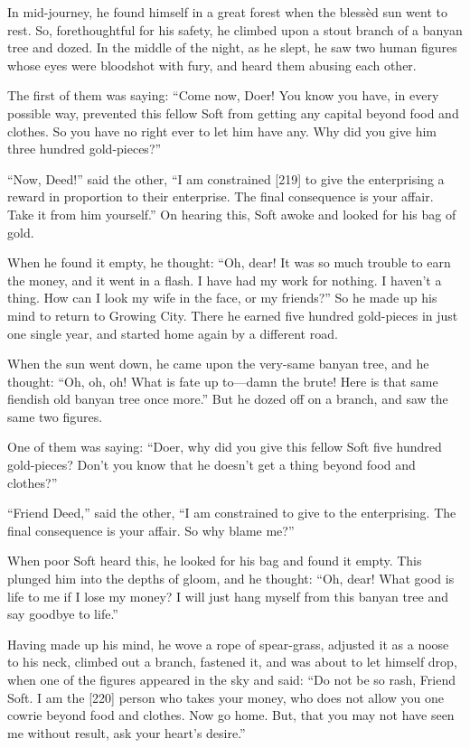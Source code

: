 \documentclass[article, twoside, 14pt]{memoir}
\begin{document}
In mid-journey, he found himself in a great forest when the blessèd
sun went to rest. So, forethoughtful for his safety, he climbed
upon a stout branch of a banyan tree and dozed. In the middle of
the night, as he slept, he saw two human figures whose eyes were
bloodshot with fury, and heard them abusing each other.

The first of them was saying:
``Come now, Doer! You know you have, in every possible way, prevented this fellow Soft from getting any capital beyond food and clothes. So you have no right ever to let him have any. Why did you give him three hundred gold-pieces?''

``Now, Deed!'' said the other,
``I am constrained [219] to give the enterprising a reward in proportion to their enterprise. The final consequence is your affair. Take it from him yourself.''
On hearing this, Soft awoke and looked for his bag of gold.

When he found it empty, he thought:
``Oh, dear! It was so much trouble to earn the money, and it went in a flash. I have had my work for nothing. I haven't a thing. How can I look my wife in the face, or my friends?''
So he made up his mind to return to Growing City. There he earned
five hundred gold-pieces in just one single year, and started home
again by a different road.

When the sun went down, he came upon the very-same banyan tree, and
he thought:
``Oh, oh, oh! What is fate up to---damn the brute! Here is that same fiendish old banyan tree once more.''
But he dozed off on a branch, and saw the same two figures.

One of them was saying:
``Doer, why did you give this fellow Soft five hundred gold-pieces? Don't you know that he doesn't get a thing beyond food and clothes?''

``Friend Deed,'' said the other,
``I am constrained to give to the enterprising. The final consequence is your affair. So why blame me?''

When poor Soft heard this, he looked for his bag and found it
empty. This plunged him into the depths of gloom, and he thought:
``Oh, dear! What good is life to me if I lose my money? I will just hang myself from this banyan tree and say goodbye to life.''

Having made up his mind, he wove a rope of spear-grass, adjusted it
as a noose to his neck, climbed out a branch, fastened it, and was
about to let himself drop, when one of the figures appeared in the
sky and said:
``Do not be so rash, Friend Soft. I am the [220] person who takes your money, who does not allow you one cowrie beyond food and clothes. Now go home. But, that you may not have seen me without result, ask your heart's desire.''
\end{document}
